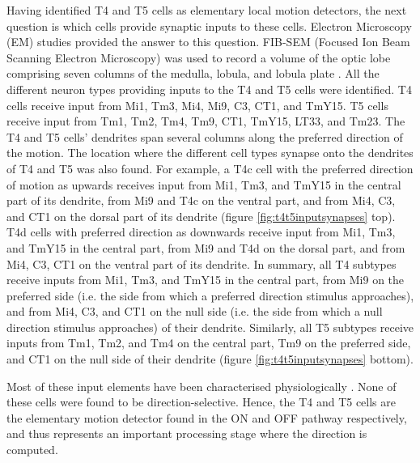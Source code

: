 Having identified T4 and T5 cells as elementary local motion detectors, the next question is which cells provide synaptic inputs to these cells. Electron Microscopy (EM) studies \parencite{Shinomiya2019, Takemura2017} provided the answer to this question. FIB-SEM (Focused Ion Beam Scanning Electron Microscopy) was used to record a volume of the optic lobe comprising seven columns of the medulla, lobula, and lobula plate \parencite{Shinomiya2019}. All the different neuron types providing inputs to the T4 and T5 cells were identified. T4 cells receive input from Mi1, Tm3, Mi4, Mi9, C3, CT1, and TmY15. T5 cells receive input from Tm1, Tm2, Tm4, Tm9, CT1, TmY15, LT33, and Tm23. The T4 and T5 cells' dendrites span several columns along the preferred direction of the motion. The location where the different cell types synapse onto the dendrites of T4 and T5 was also found. For example, a T4c cell with the preferred direction of motion as upwards receives input from Mi1, Tm3, and TmY15 in the central part of its dendrite, from Mi9 and T4c on the ventral part, and from Mi4, C3, and CT1 on the dorsal part of its dendrite (figure \ref{fig:t4t5inputsynapses} top). T4d cells with preferred direction as downwards receive input from Mi1, Tm3, and TmY15 in the central part, from Mi9 and T4d on the dorsal part, and from Mi4, C3, CT1 on the ventral part of its dendrite. In summary, all T4 subtypes receive inputs from Mi1, Tm3, and TmY15 in the central part, from Mi9 on the preferred side (i.e. the side from which a preferred direction stimulus approaches), and from Mi4, C3, and CT1 on the null side (i.e. the side from which a null direction stimulus approaches) of their dendrite. Similarly, all T5 subtypes receive inputs from Tm1, Tm2, and Tm4 on the central part, Tm9 on the preferred side, and CT1 on the null side of their dendrite (figure \ref{fig:t4t5inputsynapses} bottom). %

Most of these input elements have been characterised physiologically \parencite{Arenz2017, Serbe2016, Strother2017, Meier2019, Behnia2014, Groschner2022}. None of these cells were found to be direction-selective. Hence, the T4 and T5 cells are the elementary motion detector found in the ON and OFF pathway respectively, and thus represents an important processing stage where the direction is computed.    

